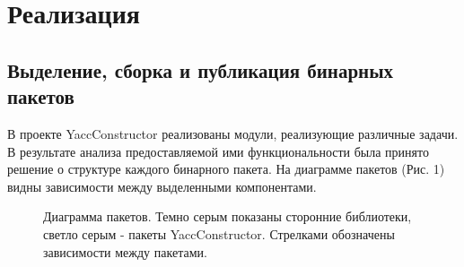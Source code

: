 \documentclass{matmex-diploma-custom}
\begin{document}
\section{Реализация}
\subsection{Выделение, сборка и публикация бинарных пакетов}  
В проекте YaccConstructor реализованы модули, реализующие различные задачи. В результате анализа предоставляемой ими функциональности была принято решение о структуре каждого бинарного пакета. 
На диаграмме пакетов (Рис. 1) видны зависимости между выделенными компонентами. 
\begin{figure}[h!]
\caption{Диаграмма пакетов. Темно серым показаны сторонние библиотеки, 
светло серым - пакеты YaccConstructor. Стрелками обозначены зависимости между пакетами.}
\end{figure}
\end{document}
